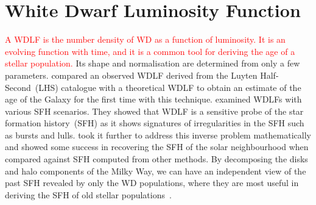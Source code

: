 \documentclass[fleqn,usenatbib]{rasti}
\begin{document}
\section{White Dwarf Luminosity Function}
\textcolor{red}{A WDLF is the number density of WD as a function of luminosity.
It is an evolving function with time, and it is a common tool for deriving the
age of a stellar population.} Its shape and normalisation are determined
from only a few parameters. \citet{1987ApJ...315L..77W} compared an observed 
WDLF derived from the Luyten Half-Second~(LHS) catalogue with a theoretical
WDLF to obtain an estimate of the age of the Galaxy for the first time with
this technique. \citet{1990ApJ...352..605N} examined WDLFs with various SFH
scenarios. They showed that WDLF is a sensitive probe of the star formation
history~(SFH) as it shows signatures of irregularities in the SFH such as bursts
and lulls. \citet{2013MNRAS.434.1549R} took it further to address this inverse
problem mathematically and showed some success in recovering the SFH of the
solar neighbourhood when compared against SFH computed from other methods. By
decomposing the disks and halo components of the Milky Way, we can have an
independent view of the past SFH revealed by only the WD populations, where
they are most useful in deriving the SFH of old stellar
populations~\citep{2011MNRAS.417...93R, 2017ASPC..509...25L}.
\end{document}
